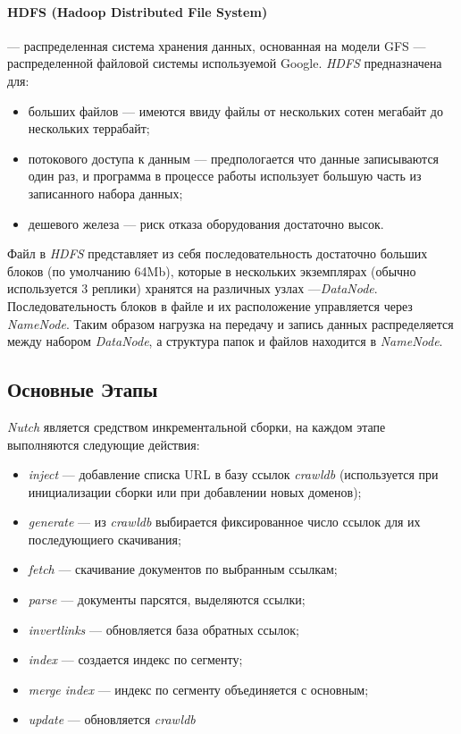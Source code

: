 \paragraph{HDFS (Hadoop Distributed File System)} --- распределенная система хранения данных, основанная на модели GFS\cite{gfs} --- распределенной файловой системы используемой Google. \textit{HDFS} предназначена для:
\begin{itemize}
 \item больших файлов --- имеются ввиду файлы от нескольких сотен мегабайт до нескольких террабайт;
 \item потокового доступа к данным --- предпологается что данные записываются один раз, и программа в процессе работы использует большую часть из записанного набора данных;
 \item дешевого железа --- риск отказа оборудования достаточно высок.
\end{itemize}
Файл в \textit{HDFS} представляет из себя последовательность достаточно больших блоков (по умолчанию 64Mb), которые в нескольких экземплярах (обычно используется 3 реплики) хранятся на различных узлах ---\textit{DataNode}. Последовательность блоков в файле и их расположение управляется через \textit{NameNode}. Таким образом нагрузка на передачу и запись данных распределяется между набором \textit{DataNode}, а структура папок и файлов находится в \textit{NameNode}.

\subsection{Основные Этапы}
\textit{Nutch} является средством инкрементальной сборки, на каждом этапе выполняются следующие действия:
\begin{itemize}
 \item \textit{inject} --- добавление списка URL в базу ссылок \textit{crawldb} (используется при инициализации сборки или при добавлении новых доменов);
 \item \textit{generate} --- из \textit{crawldb} выбирается фиксированное число ссылок для их последующиего скачивания;
 \item \textit{fetch} --- скачивание документов по выбранным ссылкам;
 \item \textit{parse} --- документы парсятся, выделяются ссылки;
 \item \textit{invertlinks} --- обновляется база обратных ссылок;
 \item \textit{index} --- создается индекс по сегменту;
 \item \textit{merge index} --- индекс по сегменту объединяется с основным;
 \item \textit{update} --- обновляется \textit{crawldb}
\end{itemize}


